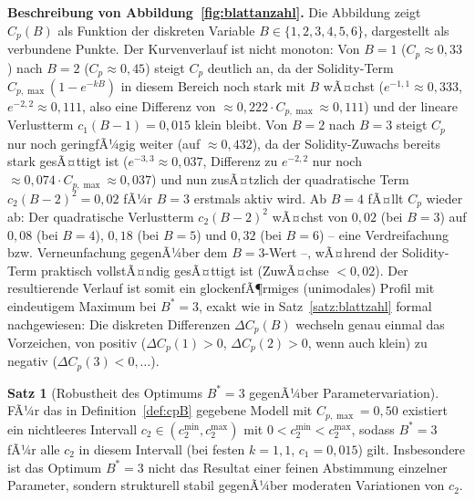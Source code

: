 ﻿\documentclass[a4paper,12pt]{article}
\theoremstyle{definition}
\newtheorem{satz}{Satz}
\begin{document}
\textbf{Beschreibung von Abbildung~\ref{fig:blattanzahl}.}
Die Abbildung zeigt $C_p(B)$ als Funktion der diskreten Variable $B\in\{1,2,3,4,5,6\}$, dargestellt als verbundene Punkte. Der Kurvenverlauf ist nicht monoton: Von $B=1$ ($C_p\approx0{,}33$) nach $B=2$ ($C_p\approx0{,}45$) steigt $C_p$ deutlich an, da der Solidity-Term $C_{p,\max}(1-e^{-kB})$ in diesem Bereich noch stark mit $B$ wÃ¤chst ($e^{-1{,}1}\approx0{,}333$, $e^{-2{,}2}\approx0{,}111$, also eine Differenz von $\approx0{,}222\cdot C_{p,\max}\approx0{,}111$) und der lineare Verlustterm $c_1(B-1)=0{,}015$ klein bleibt. Von $B=2$ nach $B=3$ steigt $C_p$ nur noch geringfÃ¼gig weiter (auf $\approx0{,}432$), da der Solidity-Zuwachs bereits stark gesÃ¤ttigt ist ($e^{-3{,}3}\approx0{,}037$, Differenz zu $e^{-2{,}2}$ nur noch $\approx0{,}074\cdot C_{p,\max}\approx0{,}037$) und nun zusÃ¤tzlich der quadratische Term $c_2(B-2)^2=0{,}02$ fÃ¼r $B=3$ erstmals aktiv wird. Ab $B=4$ fÃ¤llt $C_p$ wieder ab: Der quadratische Verlustterm $c_2(B-2)^2$ wÃ¤chst von $0{,}02$ (bei $B=3$) auf $0{,}08$ (bei $B=4$), $0{,}18$ (bei $B=5$) und $0{,}32$ (bei $B=6$) -- eine Verdreifachung bzw. Verneunfachung gegenÃ¼ber dem $B=3$-Wert --, wÃ¤hrend der Solidity-Term praktisch vollstÃ¤ndig gesÃ¤ttigt ist (ZuwÃ¤chse $<0{,}02$). Der resultierende Verlauf ist somit ein glockenfÃ¶rmiges (unimodales) Profil mit eindeutigem Maximum bei $B^*=3$, exakt wie in Satz~\ref{satz:blattzahl} formal nachgewiesen: Die diskreten Differenzen $\Delta C_p(B)$ wechseln genau einmal das Vorzeichen, von positiv ($\Delta C_p(1)>0$, $\Delta C_p(2)>0$, wenn auch klein) zu negativ ($\Delta C_p(3)<0,\ldots$).

\begin{satz}[Robustheit des Optimums $B^*=3$ gegenÃ¼ber Parametervariation]
\label{satz:robustheit_B}
FÃ¼r das in Definition~\ref{def:cpB} gegebene Modell mit $C_{p,\max}=0{,}50$ existiert ein nichtleeres Intervall $c_2\in(c_2^{\min}, c_2^{\max})$ mit $0<c_2^{\min}<c_2^{\max}$, sodass $B^*=3$ fÃ¼r alle $c_2$ in diesem Intervall (bei festen $k=1{,}1$, $c_1=0{,}015$) gilt. Insbesondere ist das Optimum $B^*=3$ nicht das Resultat einer feinen Abstimmung einzelner Parameter, sondern strukturell stabil gegenÃ¼ber moderaten Variationen von $c_2$.
\end{satz}
\end{document}
